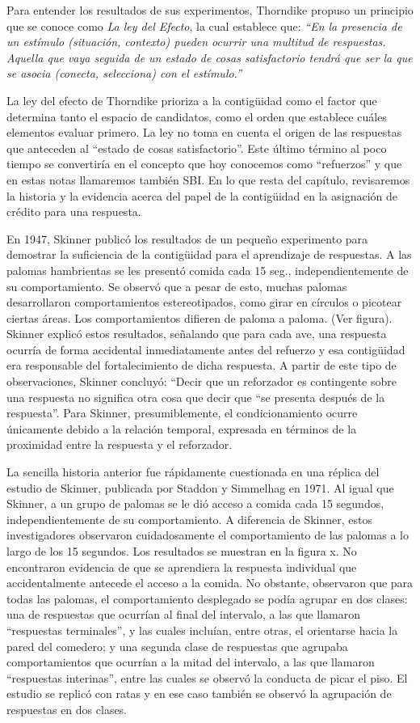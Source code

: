 \documentclass[
  a4paper,
  DIV=11,
  numbers=noendperiod]{scrreprt}
\begin{document}
Para entender los resultados de sus experimentos, Thorndike propuso un
principio que se conoce como \emph{La ley del Efecto}, la cual establece
que: \emph{``En la presencia de un estímulo (situación, contexto) pueden
ocurrir una multitud de respuestas. Aquella que vaya seguida de un
estado de cosas satisfactorio tendrá que ser la que se asocia (conecta,
selecciona) con el estímulo.''}

La ley del efecto de Thorndike prioriza a la contigüidad como el factor
que determina tanto el espacio de candidatos, como el orden que
establece cuáles elementos evaluar primero. La ley no toma en cuenta el
origen de las respuestas que anteceden al ``estado de cosas
satisfactorio''. Este último término al poco tiempo se convertiría en el
concepto que hoy conocemos como ``refuerzos'' y que en estas notas
llamaremos también SBI. En lo que resta del capítulo, revisaremos la
historia y la evidencia acerca del papel de la contigüidad en la
asignación de crédito para una respuesta.

En 1947, Skinner publicó los resultados de un pequeño experimento para
demostrar la suficiencia de la contigüidad para el aprendizaje de
respuestas. A las palomas hambrientas se les presentó comida cada 15
seg., independientemente de su comportamiento. Se observó que a pesar de
esto, muchas palomas desarrollaron comportamientos estereotipados, como
girar en círculos o picotear ciertas áreas. Los comportamientos difieren
de paloma a paloma. (Ver figura). Skinner explicó estos resultados,
señalando que para cada ave, una respuesta ocurría de forma accidental
inmediatamente antes del refuerzo y esa contigüidad era responsable del
fortalecimiento de dicha respuesta. A partir de este tipo de
observaciones, Skinner concluyó: ``Decir que un reforzador es
contingente sobre una respuesta no significa otra cosa que decir que
``se presenta después de la respuesta''. Para Skinner, presumiblemente,
el condicionamiento ocurre únicamente debido a la relación temporal,
expresada en términos de la proximidad entre la respuesta y el
reforzador.

La sencilla historia anterior fue rápidamente cuestionada en una réplica
del estudio de Skinner, publicada por Staddon y Simmelhag en 1971. Al
igual que Skinner, a un grupo de palomas se le dió acceso a comida cada
15 segundos, independientemente de su comportamiento. A diferencia de
Skinner, estos investigadores observaron cuidadosamente el
comportamiento de las palomas a lo largo de los 15 segundos. Los
resultados se muestran en la figura x. No encontraron evidencia de que
se aprendiera la respuesta individual que accidentalmente antecede el
acceso a la comida. No obstante, observaron que para todas las palomas,
el comportamiento desplegado se podía agrupar en dos clases: una de
respuestas que ocurrían al final del intervalo, a las que llamaron
``respuestas terminales'', y las cuales incluían, entre otras, el
orientarse hacia la pared del comedero; y una segunda clase de
respuestas que agrupaba comportamientos que ocurrían a la mitad del
intervalo, a las que llamaron ``respuestas interinas'', entre las cuales
se observó la conducta de picar el piso. El estudio se replicó con ratas
y en ese caso también se observó la agrupación de respuestas en dos
clases.
\end{document}
